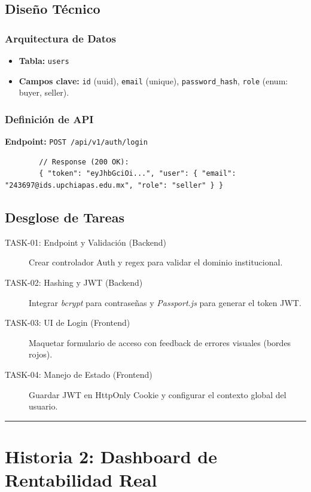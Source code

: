 \documentclass[11pt, letterpaper]{article}
\begin{document}
    \subsection{Diseño Técnico}
    \subsubsection*{Arquitectura de Datos}
    \begin{itemize}
        \item \textbf{Tabla:} \texttt{users}
        \item \textbf{Campos clave:} \texttt{id} (uuid), \texttt{email} (unique), \texttt{password\_hash}, \texttt{role} (enum: buyer, seller).
    \end{itemize}

    \subsubsection*{Definición de API}
    \textbf{Endpoint:} \texttt{POST /api/v1/auth/login}
    \begin{verbatim}
        // Response (200 OK):
        { "token": "eyJhbGciOi...", "user": { "email": "243697@ids.upchiapas.edu.mx", "role": "seller" } }
    \end{verbatim}

    \subsection{Desglose de Tareas}
    \begin{description}
        \item[TASK-01: Endpoint y Validación (Backend)] Crear controlador Auth y regex para validar el dominio institucional.
        \item[TASK-02: Hashing y JWT (Backend)] Integrar \textit{bcrypt} para contraseñas y \textit{Passport.js} para generar el token JWT.
        \item[TASK-03: UI de Login (Frontend)] Maquetar formulario de acceso con feedback de errores visuales (bordes rojos).
        \item[TASK-04: Manejo de Estado (Frontend)] Guardar JWT en HttpOnly Cookie y configurar el contexto global del usuario.
    \end{description}

    \vspace{1em}
    \hrule
    \vspace{2em}

    \section{Historia 2: Dashboard de Rentabilidad Real}
\end{document}
